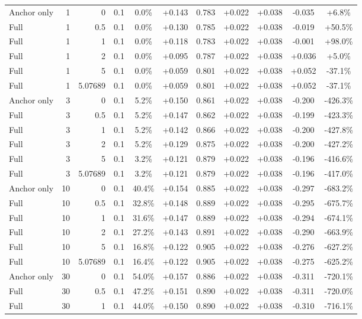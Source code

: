 \begin{table}[htbp]
\begin{tabular}{lrrrccccccc}
Anchor only & 1 & 0 & 0.1 & 0.0\% & +0.143 & 0.783 & +0.022 & +0.038 & -0.035 & +6.8\% \\
Full & 1 & 0.5 & 0.1 & 0.0\% & +0.130 & 0.785 & +0.022 & +0.038 & -0.019 & +50.5\% \\
Full & 1 & 1 & 0.1 & 0.0\% & +0.118 & 0.783 & +0.022 & +0.038 & -0.001 & +98.0\% \\
Full & 1 & 2 & 0.1 & 0.0\% & +0.095 & 0.787 & +0.022 & +0.038 & +0.036 & +5.0\% \\
Full & 1 & 5 & 0.1 & 0.0\% & +0.059 & 0.801 & +0.022 & +0.038 & +0.052 & -37.1\% \\
Full & 1 & 5.07689 & 0.1 & 0.0\% & +0.059 & 0.801 & +0.022 & +0.038 & +0.052 & -37.1\% \\
Anchor only & 3 & 0 & 0.1 & 5.2\% & +0.150 & 0.861 & +0.022 & +0.038 & -0.200 & -426.3\% \\
Full & 3 & 0.5 & 0.1 & 5.2\% & +0.147 & 0.862 & +0.022 & +0.038 & -0.199 & -423.3\% \\
Full & 3 & 1 & 0.1 & 5.2\% & +0.142 & 0.866 & +0.022 & +0.038 & -0.200 & -427.8\% \\
Full & 3 & 2 & 0.1 & 5.2\% & +0.129 & 0.875 & +0.022 & +0.038 & -0.200 & -427.2\% \\
Full & 3 & 5 & 0.1 & 3.2\% & +0.121 & 0.879 & +0.022 & +0.038 & -0.196 & -416.6\% \\
Full & 3 & 5.07689 & 0.1 & 3.2\% & +0.121 & 0.879 & +0.022 & +0.038 & -0.196 & -417.0\% \\
Anchor only & 10 & 0 & 0.1 & 40.4\% & +0.154 & 0.885 & +0.022 & +0.038 & -0.297 & -683.2\% \\
Full & 10 & 0.5 & 0.1 & 32.8\% & +0.148 & 0.889 & +0.022 & +0.038 & -0.295 & -675.7\% \\
Full & 10 & 1 & 0.1 & 31.6\% & +0.147 & 0.889 & +0.022 & +0.038 & -0.294 & -674.1\% \\
Full & 10 & 2 & 0.1 & 27.2\% & +0.143 & 0.891 & +0.022 & +0.038 & -0.290 & -663.9\% \\
Full & 10 & 5 & 0.1 & 16.8\% & +0.122 & 0.905 & +0.022 & +0.038 & -0.276 & -627.2\% \\
Full & 10 & 5.07689 & 0.1 & 16.4\% & +0.122 & 0.905 & +0.022 & +0.038 & -0.275 & -625.2\% \\
Anchor only & 30 & 0 & 0.1 & 54.0\% & +0.157 & 0.886 & +0.022 & +0.038 & -0.311 & -720.1\% \\
Full & 30 & 0.5 & 0.1 & 47.2\% & +0.151 & 0.890 & +0.022 & +0.038 & -0.311 & -720.0\% \\
Full & 30 & 1 & 0.1 & 44.0\% & +0.150 & 0.890 & +0.022 & +0.038 & -0.310 & -716.1\% \\

\end{tabular}
\end{table}
